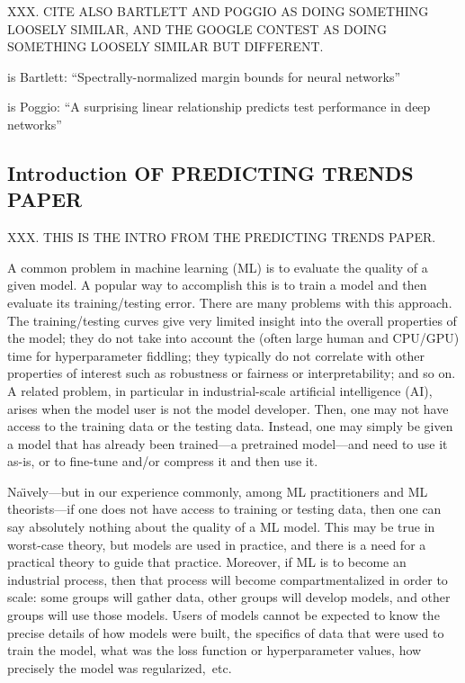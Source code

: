 \documentclass{article}
\begin{document}
XXX.  CITE ALSO BARTLETT AND POGGIO AS DOING SOMETHING LOOSELY SIMILAR, AND THE GOOGLE CONTEST AS DOING SOMETHING LOOSELY SIMILAR BUT DIFFERENT.

\cite{BFT17_TR} is Bartlett: ``Spectrally-normalized margin bounds for neural networks''

\cite{LMBx18_TR} is Poggio: ``A surprising linear relationship predicts test performance in deep networks''


\subsection{Introduction OF PREDICTING TRENDS PAPER}
\label{sxn:intro}

XXX.  THIS IS THE INTRO FROM THE PREDICTING TRENDS PAPER.

A common problem in machine learning (ML) 
is to evaluate the quality of a given model.
A popular way to accomplish this
is to train a model and then evaluate its training/testing error.
There are many problems with this approach.
The training/testing curves give very limited insight into the overall properties of the model; 
they do not take into account the (often large human and CPU/GPU) time for hyperparameter fiddling;
they typically do not correlate with other properties of interest such as robustness or fairness or interpretability; 
and so on.
A related problem, in particular in industrial-scale artificial intelligence (AI), arises when the model user is not the model developer.
Then, one may not have access to the training data or the testing data.
Instead, one may simply be given a model that has already been trained---a pretrained model---and need to use it as-is, or to fine-tune and/or compress it and then use it.

Na\"{\i}vely---but in our experience commonly, among ML practitioners and ML theorists---if one does not have access to training or testing data, then one can say absolutely nothing about the quality of a ML model.
This may be true in worst-case theory, but models are used in practice, and there is a need for a practical theory to guide that practice.
Moreover, if ML is to become an industrial process, then that process will become compartmentalized in order to scale: some groups will gather data, other groups will develop models, and other groups will use those models.
Users of models cannot be expected to know the precise details of how models were built, the specifics of data that were used to train the model, what was the loss function or hyperparameter values, how precisely the model was regularized,~etc.
\end{document}
